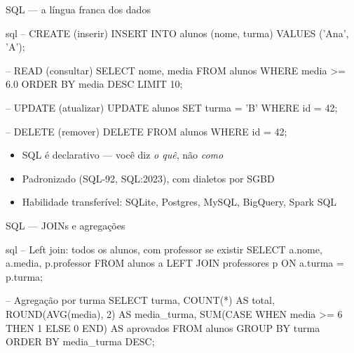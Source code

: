 \documentclass[xcolor=dvipsnames,t,aspectratio=169]{beamer}
\newcommand{\highlight}[1]{{\color{nes_dark_orange} #1}}
\begin{document}
\begin{frame}[c, fragile]{SQL — a língua franca dos dados}

\begin{code}{sql}
-- CREATE (inserir)
INSERT INTO alunos (nome, turma) VALUES ('Ana', 'A');

-- READ (consultar)
SELECT nome, media FROM alunos WHERE media >= 6.0
ORDER BY media DESC LIMIT 10;

-- UPDATE (atualizar)
UPDATE alunos SET turma = 'B' WHERE id = 42;

-- DELETE (remover)
DELETE FROM alunos WHERE id = 42;
\end{code}

\begin{itemize}
    \item SQL é \highlight{declarativo} — você diz \emph{o quê}, não \emph{como}
    \item Padronizado (SQL-92, SQL:2023), com dialetos por SGBD
    \item Habilidade transferível: SQLite, Postgres, MySQL, BigQuery, Spark SQL
\end{itemize}

\end{frame}


\begin{frame}[c, fragile]{SQL — JOINs e agregações}

\begin{code}{sql}
-- Left join: todos os alunos, com professor se existir
SELECT a.nome, a.media, p.professor
FROM alunos a
LEFT JOIN professores p ON a.turma = p.turma;

-- Agregação por turma
SELECT
    turma,
    COUNT(*)                          AS total,
    ROUND(AVG(media), 2)              AS media_turma,
    SUM(CASE WHEN media >= 6 THEN 1
             ELSE 0 END)              AS aprovados
FROM alunos
GROUP BY turma
ORDER BY media_turma DESC;
\end{code}


\end{frame}


\end{document}
